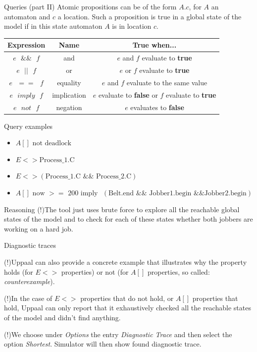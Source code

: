 \documentclass{beamer}
\begin{document}
\begin{frame}{Queries (part II)}
	Atomic propositions can be of the form $A.c$, for $A$ an automaton and $c$ a location. Such a proposition is true in a global state of the model if in this state automaton $A$ is in location $c$.\newline
	
	\begin{tabular}{|c|c|c|}
		\hline \textbf{Expression} & \textbf{Name} & \textbf{True when...} \\ 
		\hline $e\text{ }\&\&\text{ }f$ & and & $e$ and $f$ evaluate to \textbf{true}	 \\ 
		\hline $e\text{ }||\text{ }f$ & or & $e$ or $f$ evaluate to \textbf{true} \\ 
		\hline $e\text{ }==\text{ }f$ & equality & $e$ and $f$ evaluate to the same value \\ 
		\hline $e\text{ }imply\text{ }f$ & implication & $e$ evaluate to \textbf{false} or $f$ evaluate to \textbf{true}\\ 
		\hline $e\text{ }not\text{ }f$ & negation & $e$ evaluates to \textbf{false} \\ 
		\hline 
	\end{tabular} 

\end{frame}

\begin{frame}{Query examples}
	\begin{itemize}
		\item $A[] \text{ not deadlock}$
		\item $E<> \text{Process\_1.C}$
		\item $E<> (\text{Process\_1.C } \&\& \text{ Process\_2.C})$
		\item $A[] \text{ now } >= \text{ 200 imply }$
		$(\text{Belt.end } \&\& \text{ Jobber1.begin } \&\& \text{Jobber2.begin})$
		
	\end{itemize}
\end{frame}

\begin{frame}{Reasoning}
	(!)The tool just uses brute force to explore all the reachable global states of the model and to check for each of these	states whether both jobbers are working on a hard job.
\end{frame}

\begin{frame}{Diagnostic traces}
	
	(!)Uppaal can also provide a concrete example that illustrates why the property holds (for $E<>$ properties) or not (for $A[]$ properties, so called: \textit{counterexample}).\newline
	
	(!)In the case of $E<>$ properties that do not hold, or $A[]$ properties that hold, Uppaal can only report that it exhaustively checked all the reachable states of the model and didn’t find anything.\newline
	
	(!)We choose under \textit{Options} the entry \textit{Diagnostic Trace} and then select the option \textit{Shortest}. Simulator will then show found diagnostic trace.
\end{frame}
\end{document}
